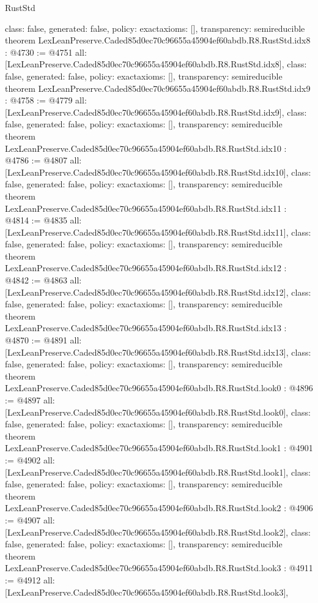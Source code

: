 \begin{lexlean}{RustStd}
\begin{coremodule}
{  class: false,
  generated: false,
  policy: exact{axioms: []},
  transparency: semireducible
}
theorem LexLeanPreserve.Caded85d0ec70c96655a45904ef60abdb.R8.RustStd.idx8 : @4730 := @4751 {
  all: [LexLeanPreserve.Caded85d0ec70c96655a45904ef60abdb.R8.RustStd.idx8],
  class: false,
  generated: false,
  policy: exact{axioms: []},
  transparency: semireducible
}
theorem LexLeanPreserve.Caded85d0ec70c96655a45904ef60abdb.R8.RustStd.idx9 : @4758 := @4779 {
  all: [LexLeanPreserve.Caded85d0ec70c96655a45904ef60abdb.R8.RustStd.idx9],
  class: false,
  generated: false,
  policy: exact{axioms: []},
  transparency: semireducible
}
theorem LexLeanPreserve.Caded85d0ec70c96655a45904ef60abdb.R8.RustStd.idx10 : @4786 := @4807 {
  all: [LexLeanPreserve.Caded85d0ec70c96655a45904ef60abdb.R8.RustStd.idx10],
  class: false,
  generated: false,
  policy: exact{axioms: []},
  transparency: semireducible
}
theorem LexLeanPreserve.Caded85d0ec70c96655a45904ef60abdb.R8.RustStd.idx11 : @4814 := @4835 {
  all: [LexLeanPreserve.Caded85d0ec70c96655a45904ef60abdb.R8.RustStd.idx11],
  class: false,
  generated: false,
  policy: exact{axioms: []},
  transparency: semireducible
}
theorem LexLeanPreserve.Caded85d0ec70c96655a45904ef60abdb.R8.RustStd.idx12 : @4842 := @4863 {
  all: [LexLeanPreserve.Caded85d0ec70c96655a45904ef60abdb.R8.RustStd.idx12],
  class: false,
  generated: false,
  policy: exact{axioms: []},
  transparency: semireducible
}
theorem LexLeanPreserve.Caded85d0ec70c96655a45904ef60abdb.R8.RustStd.idx13 : @4870 := @4891 {
  all: [LexLeanPreserve.Caded85d0ec70c96655a45904ef60abdb.R8.RustStd.idx13],
  class: false,
  generated: false,
  policy: exact{axioms: []},
  transparency: semireducible
}
theorem LexLeanPreserve.Caded85d0ec70c96655a45904ef60abdb.R8.RustStd.look0 : @4896 := @4897 {
  all: [LexLeanPreserve.Caded85d0ec70c96655a45904ef60abdb.R8.RustStd.look0],
  class: false,
  generated: false,
  policy: exact{axioms: []},
  transparency: semireducible
}
theorem LexLeanPreserve.Caded85d0ec70c96655a45904ef60abdb.R8.RustStd.look1 : @4901 := @4902 {
  all: [LexLeanPreserve.Caded85d0ec70c96655a45904ef60abdb.R8.RustStd.look1],
  class: false,
  generated: false,
  policy: exact{axioms: []},
  transparency: semireducible
}
theorem LexLeanPreserve.Caded85d0ec70c96655a45904ef60abdb.R8.RustStd.look2 : @4906 := @4907 {
  all: [LexLeanPreserve.Caded85d0ec70c96655a45904ef60abdb.R8.RustStd.look2],
  class: false,
  generated: false,
  policy: exact{axioms: []},
  transparency: semireducible
}
theorem LexLeanPreserve.Caded85d0ec70c96655a45904ef60abdb.R8.RustStd.look3 : @4911 := @4912 {
  all: [LexLeanPreserve.Caded85d0ec70c96655a45904ef60abdb.R8.RustStd.look3],
}
\end{coremodule}
\end{lexlean}
